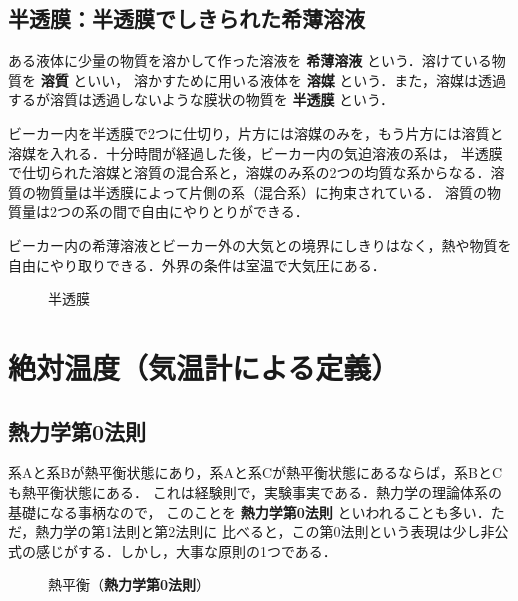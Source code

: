     \subsection{半透膜：半透膜でしきられた希薄溶液}
    ある液体に少量の物質を溶かして作った溶液を \textbf{希薄溶液} という．溶けている物質を \textbf{溶質} といい，
    溶かすために用いる液体を \textbf{溶媒} という．また，溶媒は透過するが溶質は透過しないような膜状の物質を \textbf{半透膜} という．

    ビーカー内を半透膜で2つに仕切り，片方には溶媒のみを，もう片方には溶質と溶媒を入れる．十分時間が経過した後，ビーカー内の気迫溶液の系は，
    半透膜で仕切られた溶媒と溶質の混合系と，溶媒のみ系の2つの均質な系からなる．溶質の物質量は半透膜によって片側の系（混合系）に拘束されている．
    溶質の物質量は2つの系の間で自由にやりとりができる．

    ビーカー内の希薄溶液とビーカー外の大気との境界にしきりはなく，熱や物質を自由にやり取りできる．外界の条件は室温で大気圧にある．
    \begin{figure}[hbt]
        \begin{center}
            \caption{半透膜}
            \label{fig:netsurikigaku_hantoumaku}
        \end{center}
    \end{figure}

\section{絶対温度（気温計による定義）}
    \subsection{熱力学第0法則}
        系Aと系Bが熱平衡状態にあり，系Aと系Cが熱平衡状態にあるならば，系BとCも熱平衡状態にある．
        これは経験則で，実験事実である．熱力学の理論体系の基礎になる事柄なので，
        このことを \textbf{熱力学第0法則} といわれることも多い．ただ，熱力学の第1法則と第2法則に
        比べると，この第0法則という表現は少し非公式の感じがする．しかし，大事な原則の1つである．
        \begin{figure}[hbt]
            \begin{center}
                \caption{熱平衡（\textbf{熱力学第0法則}）}
                \label{fig:netsu_heikou}
            \end{center}
        \end{figure}

